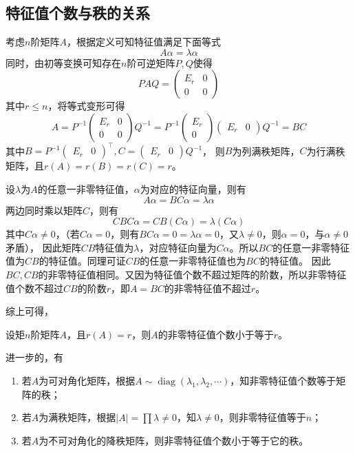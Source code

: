 \subsection{特征值个数与秩的关系}
考虑$n$阶矩阵$A$，根据定义可知特征值满足下面等式
\[ A\alpha = \lambda\alpha \]
同时，由初等变换可知存在$n$阶可逆矩阵$P,Q$使得
\[
    PAQ =
    \begin{pmatrix}
        E_r & 0 \\
        0   & 0
    \end{pmatrix}
\]
其中$r\leq n$，将等式变形可得
\[
    A =
    P^{-1}
    \begin{pmatrix}
        E_r & 0 \\
        0   & 0
    \end{pmatrix}
    Q^{-1}
    =
    P^{-1}
    \begin{pmatrix}
        E_r \\ 0
    \end{pmatrix}
    \begin{pmatrix}
        E_r & 0
    \end{pmatrix}
    Q^{-1}
    =BC
\]
其中$B=P^{-1}\begin{pmatrix}E_r & 0\end{pmatrix}^\intercal, C = \begin{pmatrix}E_r & 0\end{pmatrix}Q^{-1}$，
则$B$为列满秩矩阵，$C$为行满秩矩阵，且$r(A) = r(B) = r(C) = r$。

设$\lambda$为$A$的任意一非零特征值，$\alpha$为对应的特征向量，则有
\[ A\alpha = BC\alpha = \lambda\alpha \]
两边同时乘以矩阵$C$，则有
\[ CBC\alpha = CB(C\alpha) = \lambda(C\alpha) \]
其中$C\alpha\neq 0$，（若$C\alpha = 0$，则有$BC\alpha = 0 = \lambda\alpha = 0$，又$\lambda\neq 0$，则$\alpha=0$，与$\alpha\neq 0$矛盾），
因此矩阵$CB$特征值为$\lambda$，对应特征向量为$C\alpha$。所以$BC$的任意一非零特征值为$CB$的特征值。同理可证$CB$的任意一非零特征值也为$BC$的特征值。
因此$BC,CB$的非零特征值相同。又因为特征值个数不超过矩阵的阶数，所以非零特征值个数不超过$CB$的阶数$r$，即$A=BC$的非零特征值不超过$r$。

综上可得，
\begin{theorem}
    设矩$n$阶矩阵$A$，且$r(A)=r$，则$A$的非零特征值个数小于等于$r$。
\end{theorem}
进一步的，有
\begin{enumerate}[(1)]
    \item 若$A$为可对角化矩阵，根据$A\sim \operatorname{diag}(\lambda_1,\lambda_2,\cdots)$，知非零特征值个数等于矩阵的秩；
    \item 若$A$为满秩矩阵，根据$|A|=\prod \lambda \neq 0$，知$\lambda\neq 0$，则非零特征值等于$n$；
    \item 若$A$为不可对角化的降秩矩阵，则非零特征值个数小于等于它的秩。
\end{enumerate}

